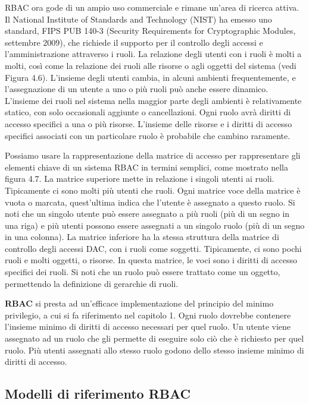 \singlespacing

RBAC ora gode di un ampio uso commerciale e rimane un'area di ricerca attiva. Il National Institute of Standards and Technology (NIST) ha emesso uno standard, FIPS PUB 140-3 (Security Requirements for Cryptographic Modules, settembre 2009), che richiede il supporto per il controllo degli accessi e l'amministrazione attraverso i ruoli. La relazione degli utenti con i ruoli è molti a molti, così come la relazione dei ruoli alle risorse o agli oggetti del sistema (vedi Figura 4.6). L'insieme degli utenti cambia, in alcuni ambienti frequentemente, e l'assegnazione di un utente a uno o più ruoli può anche essere dinamico. L'insieme dei ruoli nel sistema nella maggior parte degli ambienti è relativamente statico, con solo occasionali aggiunte o cancellazioni. Ogni ruolo avrà diritti di accesso specifici a una o più risorse. L'insieme delle risorse e i diritti di accesso specifici associati con un particolare ruolo è probabile che cambino raramente.

\singlespacing

Possiamo usare la rappresentazione della matrice di accesso per rappresentare gli elementi chiave di un sistema RBAC in termini semplici, come mostrato nella figura 4.7. La matrice superiore mette in relazione i singoli utenti ai ruoli. Tipicamente ci sono molti più utenti che ruoli. Ogni matrice voce della matrice è vuota o marcata, quest'ultima indica che l'utente è assegnato a questo ruolo. Si noti che un singolo utente può essere assegnato a più ruoli (più di un segno in una riga) e più utenti possono essere assegnati a un singolo ruolo (più di un segno in una colonna). La matrice inferiore ha la stessa struttura della matrice di controllo degli accessi DAC, con i ruoli come soggetti. Tipicamente, ci sono pochi ruoli e molti oggetti, o risorse. In questa matrice, le voci sono i diritti di accesso specifici dei ruoli. Si noti che un ruolo può essere trattato come un oggetto, permettendo la definizione di gerarchie di ruoli.

\singlespacing

\textbf{RBAC} si presta ad un'efficace implementazione del principio del minimo privilegio, a cui si fa riferimento nel capitolo 1. Ogni ruolo dovrebbe contenere l'insieme minimo di diritti di accesso necessari per quel ruolo. Un utente viene assegnato ad un ruolo che gli permette di eseguire solo ciò che è richiesto per quel ruolo. Più utenti assegnati allo stesso ruolo godono dello stesso insieme minimo di diritti di accesso.
\newpage
\subsection{Modelli di riferimento RBAC}

